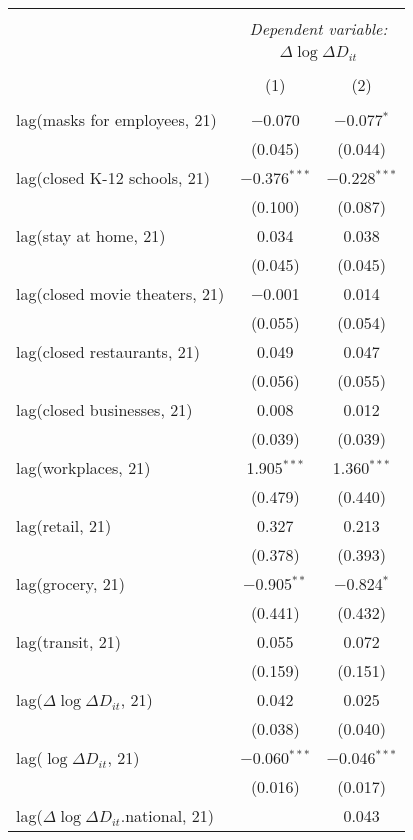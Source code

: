 \begin{tabular}{@{\extracolsep{1pt}}lcc} 
\\[-1.8ex]\hline 
\hline \\[-1.8ex] 
 & \multicolumn{2}{c}{\textit{Dependent variable:}} \\ 
\cline{2-3} 
 & \multicolumn{2}{c}{$\Delta \log \Delta D_{it}$} \\ 
\\[-1.8ex] & (1) & (2)\\ 
\hline \\[-1.8ex] 
 lag(masks for employees, 21) & $-$0.070 & $-$0.077$^{*}$ \\ 
  & (0.045) & (0.044) \\ 
  lag(closed K-12 schools, 21) & $-$0.376$^{***}$ & $-$0.228$^{***}$ \\ 
  & (0.100) & (0.087) \\ 
  lag(stay at home, 21) & 0.034 & 0.038 \\ 
  & (0.045) & (0.045) \\ 
  lag(closed movie theaters, 21) & $-$0.001 & 0.014 \\ 
  & (0.055) & (0.054) \\ 
  lag(closed restaurants, 21) & 0.049 & 0.047 \\ 
  & (0.056) & (0.055) \\ 
  lag(closed businesses, 21) & 0.008 & 0.012 \\ 
  & (0.039) & (0.039) \\ 
  lag(workplaces, 21) & 1.905$^{***}$ & 1.360$^{***}$ \\ 
  & (0.479) & (0.440) \\ 
  lag(retail, 21) & 0.327 & 0.213 \\ 
  & (0.378) & (0.393) \\ 
  lag(grocery, 21) & $-$0.905$^{**}$ & $-$0.824$^{*}$ \\ 
  & (0.441) & (0.432) \\ 
  lag(transit, 21) & 0.055 & 0.072 \\ 
  & (0.159) & (0.151) \\ 
  lag($\Delta \log \Delta D_{it}$, 21) & 0.042 & 0.025 \\ 
  & (0.038) & (0.040) \\ 
  lag($\log \Delta D_{it}$, 21) & $-$0.060$^{***}$ & $-$0.046$^{***}$ \\ 
  & (0.016) & (0.017) \\ 
  lag($\Delta \log \Delta D_{it}$.national, 21) &  & 0.043 \\ 

\end{tabular}
